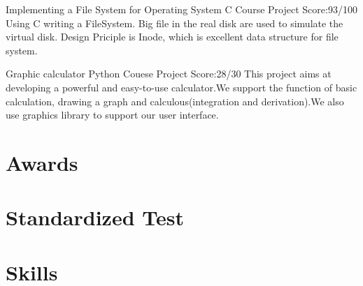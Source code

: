 \documentclass[11pt,a4paper]{moderncv}
\begin{document}
{Implementing a File System for Operating System}
{C}
{Course Project}
{Score:93/100}
{
Using C writing a FileSystem. Big file in the real disk are used to simulate the virtual disk. Design Priciple is Inode, which is excellent data structure for file system.\\
}


\vspace*{0.2\baselineskip}
{Graphic calculator}
{Python}
{Couese Project}
{Score:28/30}
{
This project aims at developing a powerful and easy-to-use calculator.We support the function of basic
calculation, drawing a graph and calculous(integration and derivation).We also use graphics library to support our user interface.\\
}

\section{Awards}

\section{Standardized Test}


\section{Skills}



\end{document}
